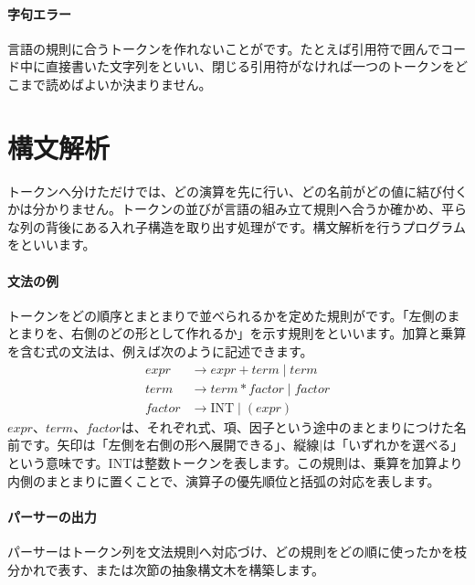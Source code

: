 \par
\endgroup
\medskip
\begingroup
\paragraph{字句エラー}
        言語の規則に合うトークンを作れないことがです。たとえば引用符で囲んでコード中に直接書いた文字列をといい、閉じる引用符がなければ一つのトークンをどこまで読めばよいか決まりません。

\par
\endgroup
\par
\endgroup


\section{構文解析}
\label{sec:02-language-07}

トークンへ分けただけでは、どの演算を先に行い、どの名前がどの値に結び付くかは分かりません。トークンの並びが言語の組み立て規則へ合うか確かめ、平らな列の背後にある入れ子構造を取り出す処理がです。構文解析を行うプログラムをといいます。

\begingroup
\begingroup
\paragraph{文法の例}
        トークンをどの順序とまとまりで並べられるかを定めた規則がです。「左側のまとまりを、右側のどの形として作れるか」を示す規則をといいます。加算と乗算を含む式の文法は、例えば次のように記述できます。
        \[
        \begin{aligned}
          \mathit{expr} &\rightarrow \mathit{expr}+\mathit{term}\mid\mathit{term}\\
          \mathit{term} &\rightarrow \mathit{term}*\mathit{factor}\mid\mathit{factor}\\
          \mathit{factor} &\rightarrow \mathrm{INT}\mid(\mathit{expr})
        \end{aligned}
        \]
        $\mathit{expr}$、$\mathit{term}$、$\mathit{factor}$は、それぞれ式、項、因子という途中のまとまりにつけた名前です。矢印は「左側を右側の形へ展開できる」、縦線$\mid$は「いずれかを選べる」という意味です。INTは整数トークンを表します。この規則は、乗算を加算より内側のまとまりに置くことで、演算子の優先順位と括弧の対応を表します。

\par
\endgroup
\medskip
\begingroup
\paragraph{パーサーの出力}
        パーサーはトークン列を文法規則へ対応づけ、どの規則をどの順に使ったかを枝分かれで表す、または次節の抽象構文木を構築します。

